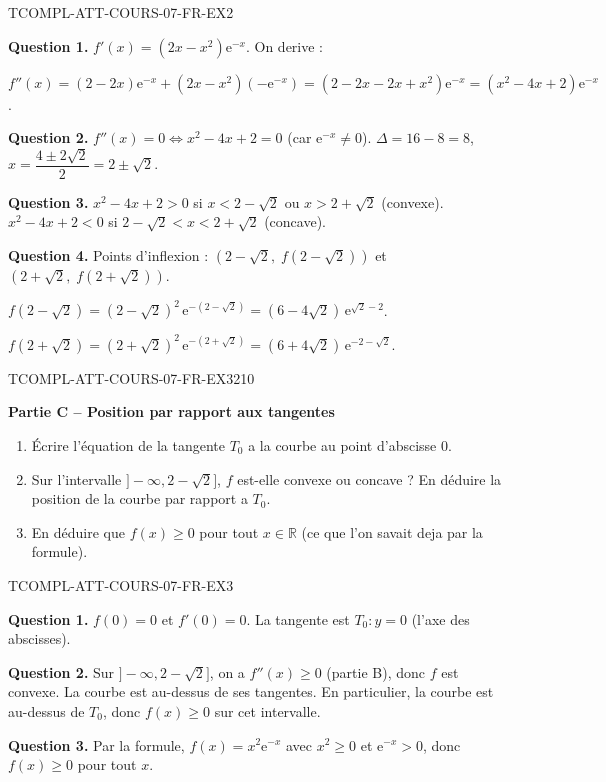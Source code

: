 \begin{corrige}{TCOMPL-ATT-COURS-07-FR-EX2}

\textbf{Question 1.} $f'(x) = (2x - x^2)\mathrm{e}^{-x}$. On derive :

$f''(x) = (2 - 2x)\mathrm{e}^{-x} + (2x - x^2)(-\mathrm{e}^{-x}) = (2 - 2x - 2x + x^2)\mathrm{e}^{-x} = (x^2 - 4x + 2)\mathrm{e}^{-x}$.

\textbf{Question 2.} $f''(x) = 0 \iff x^2 - 4x + 2 = 0$ (car $\mathrm{e}^{-x}
\neq 0$). $\Delta = 16 - 8 = 8$, $x = \dfrac{4 \pm 2\sqrt{2}}{2} = 2 \pm \sqrt{2}$.

\textbf{Question 3.} $x^2 - 4x + 2 > 0$ si $x < 2 - \sqrt{2}$ ou $x > 2 + \sqrt{2}$ (convexe). $x^2 - 4x + 2 < 0$ si $2 - \sqrt{2} < x < 2 + \sqrt{2}$ (concave).

\textbf{Question 4.} Points d'inflexion : $(2 - \sqrt{2},\; f(2-\sqrt{2}))$ et $(2 + \sqrt{2},\; f(2+\sqrt{2}))$.

$f(2-\sqrt{2}) = (2-\sqrt{2})^2\,\mathrm{e}^{-(2-\sqrt{2})} = (6-4\sqrt{2})\,\mathrm{e}^{\sqrt{2}-2}$.

$f(2+\sqrt{2}) = (2+\sqrt{2})^2\,\mathrm{e}^{-(2+\sqrt{2})} = (6+4\sqrt{2})\,\mathrm{e}^{-2-\sqrt{2}}$.

\end{corrige}

\bigskip


\begin{exercice}{TCOMPL-ATT-COURS-07-FR-EX3}{2}{10}

\textbf{Partie C -- Position par rapport aux tangentes}

\begin{enumerate}
  \item Écrire l'équation de la tangente $T_0$ a la courbe au point d'abscisse $0$.
  \item Sur l'intervalle $]-\infty, 2 - \sqrt{2}]$, $f$ est-elle convexe ou concave ? En déduire la position de la courbe par rapport a $T_0$.
  \item En déduire que $f(x) \geq 0$ pour tout $x \in \mathbb{R}$ (ce que l'on savait deja par la formule).
\end{enumerate}

\end{exercice}

\begin{corrige}{TCOMPL-ATT-COURS-07-FR-EX3}

\textbf{Question 1.} $f(0) = 0$ et $f'(0) = 0$. La tangente est $T_0 : y = 0$ (l'axe des abscisses).

\textbf{Question 2.} Sur $]-\infty, 2 - \sqrt{2}]$, on a $f''(x) \geq 0$ (partie B), donc $f$ est convexe. La courbe est au-dessus de ses tangentes. En particulier, la courbe est au-dessus de $T_0$, donc $f(x) \geq 0$ sur cet intervalle.

\textbf{Question 3.} Par la formule, $f(x) = x^2 \mathrm{e}^{-x}$ avec $x^2 \geq 0$ et $\mathrm{e}^{-x} > 0$, donc $f(x) \geq 0$ pour tout $x$.

\end{corrige}
